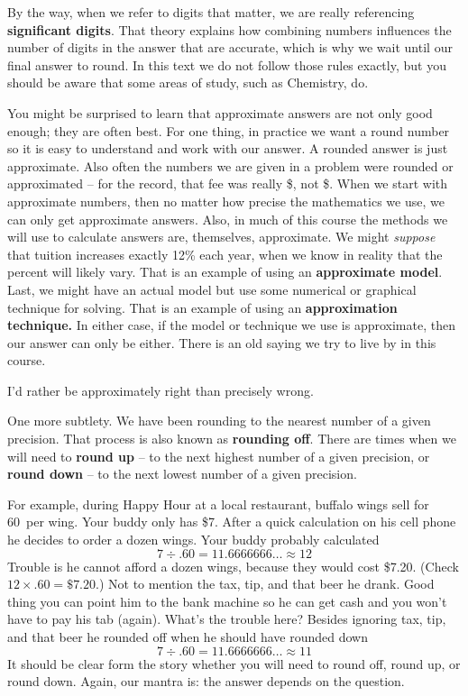 By the way, when we refer to digits that matter, we are really referencing \textbf{significant digits}.  That theory explains how combining numbers influences the number of digits in the answer that are accurate, which is why we wait until our final answer to round.  In this text we do not follow those rules exactly, %
but you should be aware that some areas of study, such as Chemistry, do. 

You might be surprised to learn that approximate answers are not only good enough; they are often best.   For one thing, in practice we want a round number so it is easy to understand and work with our answer.  A rounded answer is just approximate. Also often the numbers we are given in a problem were rounded or approximated -- for the record, that fee was really \$, not \$. When we start with approximate numbers, then no matter how precise the mathematics we use, we can only get approximate answers.  Also, in much of this course the methods we will use to calculate answers are, themselves, approximate.  We might \emph{suppose} that tuition increases exactly 12\% each year, when we know in reality that the percent will likely vary.  That is an example of using an \textbf{approximate model}.  Last, we might have an actual model but use some numerical or graphical technique for solving.  That is an example of using an \textbf{approximation technique.}  In either case, if the model or technique we use is approximate, then our answer can only be either.
There is an old saying we try to live by in this course.
\begin{center}
I'd rather be approximately right than precisely wrong.
\end{center}

One more subtlety.  We have been rounding to the nearest number of a given precision.   That process is also known as \textbf{rounding off}.  There are times when we will need to \textbf{round up} -- to the next highest number of a given precision, or \textbf{round down} -- to the next lowest number of a given precision.  

For example, during Happy Hour at a local restaurant, buffalo wings sell for 60\textcent ~per wing.   Your buddy only has \$7.  After a quick calculation on his cell phone he decides to order a dozen wings.  Your buddy probably calculated $$7 \div .60 = 11.6666666\ldots \approx 12$$
Trouble is he cannot afford a dozen wings, because they would cost \$7.20.  
(Check $12 \times .60 = \$7.20 $.)
Not to mention the tax, tip, and that beer he drank.  Good thing you can point him to the bank machine so he can get cash and you won't have to pay his tab (again).  What's the trouble here? Besides ignoring tax, tip, and that beer he rounded off when he should have rounded down
 $$7 \div .60 = 11.6666666\ldots \approx 11$$
It should be clear form the story whether you will need to round off, round up, or round down. Again, our mantra is: the answer depends on the question.  


